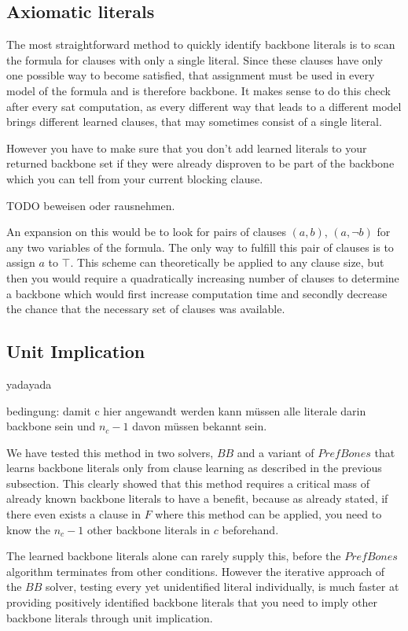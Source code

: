 \subsection{Axiomatic literals}
The most straightforward method to quickly identify backbone literals is to scan the formula for clauses with only a single literal. Since these clauses have only one possible way to become satisfied, that assignment must be used in every model of the formula and is therefore backbone. It makes sense to do this check after every sat computation, as every different way that leads to a different model brings different learned clauses, that may sometimes consist of a single literal.

However you have to make sure that you don't add learned literals to your returned backbone set if they were already disproven to be part of the backbone which you can tell from your current blocking clause.

TODO beweisen oder rausnehmen.

An expansion on this would be to look for pairs of clauses $(a,b)$, $(a,\neg b)$ for any two variables of the formula. The only way to fulfill this pair of clauses is to assign $a$ to $\top$. This scheme can theoretically be applied to any clause size, but then you would require a quadratically increasing number of clauses to determine a backbone which would first increase computation time and secondly decrease the chance that the necessary set of clauses was available.


\subsection{Unit Implication}

yadayada

bedingung: damit c hier angewandt werden kann müssen alle literale darin backbone sein und $n_c - 1$ davon müssen bekannt sein.


We have tested this method in two solvers, $BB$ and a variant of $PrefBones$ that learns backbone literals only from clause learning as described in the previous subsection. This clearly showed that this method requires a critical mass of already known backbone literals to have a benefit, because as already stated, if there even exists a clause in $F$ where this method can be applied, you need to know the $n_c - 1$ other backbone literals in $c$ beforehand.

The learned backbone literals alone can rarely supply this, before the $PrefBones$ algorithm terminates from other conditions. However the iterative approach of the $BB$ solver, testing every yet unidentified literal individually, is much faster at providing positively identified backbone literals that you need to imply other backbone literals through unit implication.

